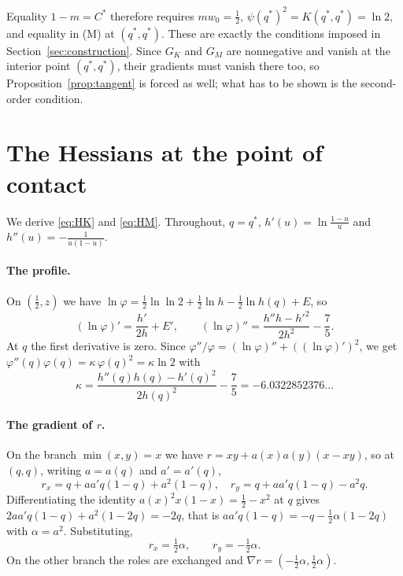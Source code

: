 \documentclass[12pt]{article}
\theoremstyle{plain}
\newcommand{\qs}{q^{*}}
\newcommand{\Cs}{C^{*}}
\begin{document}
Equality $1-m=\Cs$ therefore requires $mw_0=\frac12$, $\psi(\qs)^2=K(\qs,\qs)=\ln 2$, and equality in (M) at $(\qs,\qs)$. These are exactly the conditions imposed in Section~\ref{sec:construction}. Since $G_K$ and $G_M$ are nonnegative and vanish at the interior point $(\qs,\qs)$, their gradients must vanish there too, so Proposition~\ref{prop:tangent} is forced as well; what has to be shown is the second-order condition.

\section{The Hessians at the point of contact}\label{app:hessian}

We derive \eqref{eq:HK} and \eqref{eq:HM}. Throughout, $q=\qs$, $h'(u)=\ln\frac{1-u}{u}$ and $h''(u)=-\frac{1}{u(1-u)}$.

\paragraph*{The profile.} On $(\frac12,z)$ we have $\ln\varphi=\frac12\ln\ln 2+\frac12\ln h-\frac12\ln h(q)+E$, so
\[
(\ln\varphi)'=\frac{h'}{2h}+E',\qquad (\ln\varphi)''=\frac{h''h-h'^2}{2h^2}-\frac75 .
\]
At $q$ the first derivative is zero. Since $\varphi''/\varphi=(\ln\varphi)''+((\ln\varphi)')^2$, we get $\varphi''(q)\varphi(q)=\kappa\,\varphi(q)^2=\kappa\ln 2$ with
\[
\kappa=\frac{h''(q)h(q)-h'(q)^2}{2h(q)^2}-\frac75=-6.0322852376\ldots
\]

\paragraph*{The gradient of $r$.} On the branch $\min(x,y)=x$ we have $r=xy+a(x)a(y)(x-xy)$, so at $(q,q)$, writing $a=a(q)$ and $a'=a'(q)$,
\[
r_x=q+aa'q(1-q)+a^2(1-q),\quad r_y=q+aa'q(1-q)-a^2q .
\]
Differentiating the identity $a(x)^2x(1-x)=\frac12-x^2$ at $q$ gives $2aa'q(1-q)+a^2(1-2q)=-2q$, that is $aa'q(1-q)=-q-\frac12\alpha(1-2q)$ with $\alpha=a^2$. Substituting,
\[
r_x=\tfrac12\alpha,\qquad r_y=-\tfrac12\alpha .
\]
On the other branch the roles are exchanged and $\nabla r=(-\frac12\alpha,\frac12\alpha)$.
\end{document}
